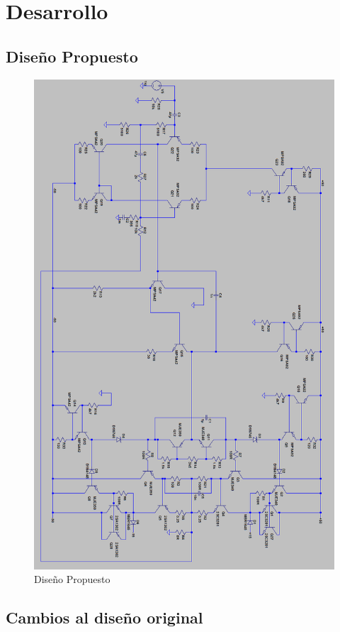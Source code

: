\documentclass[a4paper,12pt,twoside]{article}
\begin{document}
\newpage
\section{Desarrollo}
\subsection{Diseño Propuesto}
\begin{figure}[H]
	\centering
	\includegraphics[scale=0.65]{img/circuito_propuesto}
	\caption{Diseño Propuesto}
	\label{diseniopropuesto}
\end{figure}
\subsection{Cambios al diseño original}
\end{document}
